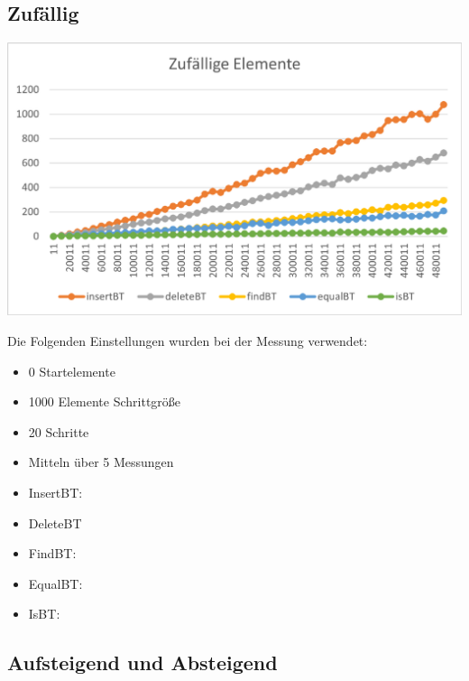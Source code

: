 \documentclass[11pt]{article}
\begin{document}
    \subsection{Zufällig}\label{subsec:zufaellig}

    \begin{center}
        \includegraphics[width=0.9\columnwidth] {ZeitAvg.pdf}
    \end{center}

    Die Folgenden Einstellungen wurden bei der Messung verwendet:
    \begin{itemize}
        \item 0 Startelemente
        \item 1000 Elemente Schrittgröße
        \item 20 Schritte
        \item Mitteln über 5 Messungen
    \end{itemize}
    \begin{itemize}
        \item InsertBT:

        \item DeleteBT

        \item FindBT:

        \item EqualBT:

        \item IsBT:
    \end{itemize}

    \subsection{Aufsteigend und Absteigend}\label{subsec:average}
\end{document}
